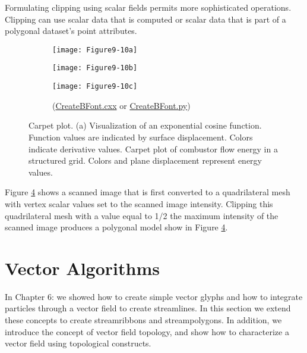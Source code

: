 Formulating clipping using scalar fields permits more sophisticated operations. Clipping can use scalar data that is computed or scalar data that is part of a polygonal dataset's point attributes.

\begin{figure}[!htb]
    \centering
    \begin{subfigure}{0.41\linewidth}
        \centering
        \texttt{[image: Figure9-10a]}
        \caption*{}\label{fig:Figure9-10a}
    \end{subfigure}
    \hfill
    \begin{subfigure}{0.16\linewidth}
        \centering
        \texttt{[image: Figure9-10b]}
        \caption*{}\label{fig:Figure9-10b}
    \end{subfigure}%
    \hfill
    \begin{subfigure}{0.41\linewidth}
        \centering
        \texttt{[image: Figure9-10c]}
        \caption*{(\href{https://lorensen.github.io/VTKExamples/site/Cxx/VisualizationAlgorithms/CreateBFont/}{CreateBFont.cxx} or \href{https://lorensen.github.io/VTKExamples/site/Python/VisualizationAlgorithms/CreateBFont/}{CreateBFont.py})}\label{fig:Figure9-10c}
    \end{subfigure}%
    \caption{Carpet plot. (a) Visualization of an exponential cosine function. Function values are indicated by surface displacement. Colors indicate derivative values. Carpet plot of combustor flow energy in a structured grid. Colors and plane displacement represent energy values.}
    \label{fig:Figure9-10}
\end{figure}

Figure \ref{fig:Figure9-10} shows a scanned image that is first converted to a quadrilateral mesh with vertex scalar values set to the scanned image intensity. Clipping this quadrilateral mesh with a value equal to 1/2 the maximum intensity of the scanned image produces a polygonal model show in Figure \ref{fig:Figure9-10}.

\section{Vector Algorithms}

In Chapter 6:  we showed how to create simple vector glyphs and how to integrate particles through a vector field to create streamlines. In this section we extend these concepts to create streamribbons and streampolygons. In addition, we introduce the concept of vector field topology, and show how to characterize a vector field using topological constructs.

